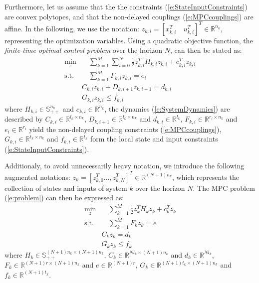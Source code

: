 Furthermore, let us assume that the the constraints (\ref{e:StateInputConstraints}) are convex polytopes, and that the non-delayed couplings (\ref{e:MPCcouplings}) are affine. In the following, we use the notation: $z_{k,i} = [x_{k,i}^T \quad u_{k,i}^T]^T \in \mathbb{R}^{n_{k}}$, representing the optimization variables. Using a quadratic objective function, the \emph{finite-time optimal control problem} over the horizon $N$, can then be stated as:
\begin{subequations}
\label{e:problem}
\begin{align}
\min_z & \quad \sum_{k=1}^{M} \sum_{i=0}^N \frac{1}{2}z_{k,i}^TH_{k,i}z_{k,i} + c_{k,i}^Tz_{k,i} \label{e:1} \\
\text{s.t.} & \quad \sum_{k=1}^{M} F_{k,i}z_{k,i} = e_i \label{e:CoupConstControl} \\
& C_{k,i}z_{k,i} + D_{k,i+1}z_{k,i+1} = d_{k,i} \label{e:dynamics} \\
& G_{k,i}z_{k,i} \leq f_{k,i}
\end{align}
\end{subequations}
where $H_{k,i} \in \mathbb{S}_{++}^{n_{k}}$ and $c_{k,i} \in \mathbb{R}^{n_k}$, the dynamics (\ref{e:SystemDynamics}) are described by $C_{k,i} \in \mathbb{R}^{l_{k} \times n_{k}}$, $D_{k,i+1} \in \mathbb{R}^{l_{k} \times n_{k}}$ and $d_{k,i} \in \mathbb{R}^{l_{k}}$, $F_{k,i} \in \mathbb{R}^{r_{i} \times n_{k}}$ and $e_i \in \mathbb{R}^{r_i}$ yield the non-delayed coupling constraints (\ref{e:MPCcouplings}), $G_{k,i} \in \mathbb{R}^{t_{k} \times n_{k}}$ and $f_{k,i} \in \mathbb{R}^{t_{k}}$ form the local state and input constraints (\ref{e:StateInputConstraints}).

Additionaly, to avoid unnecessarily heavy notation, we introduce the following augmented notations: $z_k = [z_{k,0}^T \dots, z_{k,N}^T]^T \in \mathbb{R}^{(N+1)n_k}$, which represents the collection of states and inputs of system $k$ over the horizon $N$. The MPC problem (\ref{e:problem}) can then be expressed as:
\begin{subequations}
\label{e:problem1}
\begin{align}
\min_z & \quad \sum_{k=1}^{M} \frac{1}{2}z_k^TH_k z_k + c_k^Tz_k \label{e:1} \\
\text{s.t.} & \quad \sum_{k=1}^{M} F_k z_k = e \label{e:CoupConst} \\
& C_k z_k = d_k \label{e:3} \\
& G_k z_k \leq f_k \label{e:ineqConst}
\end{align}
\end{subequations}
where $H_{k} \in \mathbb{S}_{++}^{(N+1)n_{k} \times (N+1)n_{k}}$, $C_{k} \in \mathbb{R}^{N l_{k} \times (N+1)n_{k}}$ and $d_{k} \in \mathbb{R}^{N l_{k}}$, $F_{k} \in \mathbb{R}^{(N+1) r \times (N+1) n_{k}}$ and $e \in \mathbb{R}^{(N+1)r}$, $G_{k} \in \mathbb{R}^{(N+1) t_{k} \times (N+1) n_{k}}$ and $f_{k} \in \mathbb{R}^{(N+1) t_{k}}$.

